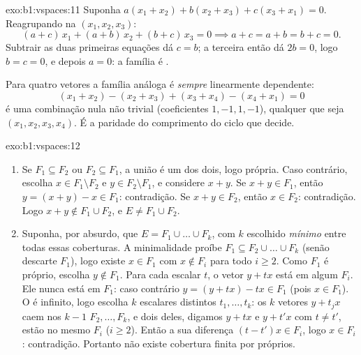 \begin{solution}{exo:b1:vspaces:11}
Suponha $a(x_1 + x_2) + b(x_2 + x_3) + c(x_3 + x_1) = 0$.
Reagrupando na  $(x_1, x_2, x_3)$:
\[
(a + c)\,x_1 + (a + b)\,x_2 + (b + c)\,x_3 = 0
\implies a + c = a + b = b + c = 0 .
\]
Subtrair as duas primeiras equações dá $c = b$; a terceira então dá
$2b = 0$, logo $b = c = 0$, e depois $a = 0$: a família é .

Para quatro vetores a família análoga é \emph{sempre} linearmente
dependente:
\[
(x_1 + x_2) - (x_2 + x_3) + (x_3 + x_4) - (x_4 + x_1) = 0
\]
é uma combinação nula não trivial (coeficientes $1, -1, 1, -1$), qualquer que
seja $(x_1, x_2, x_3, x_4)$. É a paridade do comprimento do ciclo que decide.
\end{solution}

\begin{solution}{exo:b1:vspaces:12}
\begin{enumerate}
  \item Se $F_1 \subseteq F_2$ ou $F_2 \subseteq F_1$, a união é um dos dois, logo própria.
        Caso contrário, escolha $x \in F_1
        \setminus F_2$ e $y \in F_2 \setminus F_1$, e considere
        $x + y$. Se $x + y \in F_1$, então $y = (x + y) - x \in
        F_1$: contradição. Se $x + y \in F_2$,
        então $x \in F_2$: contradição. Logo $x + y \notin F_1 \cup F_2$, e $E \neq
        F_1 \cup F_2$.
  \item Suponha, por absurdo, que $E = F_1 \cup \dots \cup
        F_k$, com $k$ escolhido
        \emph{mínimo} entre todas essas coberturas. A minimalidade
        proíbe $F_1 \subseteq F_2 \cup
        \dots \cup F_k$ (senão descarte $F_1$), logo existe $x \in F_1$
        com $x \notin F_i$ para todo $i \geq 2$. Como $F_1$ é próprio, escolha
        $y \notin F_1$. Para cada escalar $t$, o vetor $y + t x$ está em
        algum $F_i$. Ele nunca está em $F_1$: caso contrário
        $y = (y + tx) - tx \in F_1$ (pois $x \in
        F_1$). O  é infinito, logo escolha $k$
        escalares distintos $t_1, \dots, t_k$: os $k$ vetores $y + t_j x$ caem nos
        $k - 1$  $F_2, \dots, F_k$, e dois deles, digamos $y + t x$
        e $y + t' x$ com $t \neq t'$, estão no mesmo $F_i$ ($i \geq 2$). Então a
        sua diferença $(t - t')x \in F_i$, logo $x \in F_i$: contradição. Portanto
        não existe cobertura finita por  próprios.
\end{enumerate}
\end{solution}

